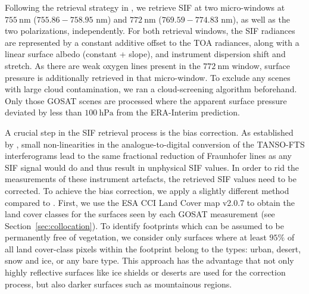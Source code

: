 \documentclass[review, a4paper, 10pt, times]{elsarticle}
\begin{document}
Following the retrieval strategy in \citet{Frankenberg2011}, we retrieve SIF at two micro-windows at $755\:\mathrm{nm}$ ($755.86 - 758.95$ nm) and $772\:\mathrm{nm}$ ($769.59 - 774.83$ nm), as well as the two polarizations, independently. For both retrieval windows, the SIF radiances are represented by a constant additive offset to the TOA radiances, along with a linear surface albedo (constant + slope), and instrument dispersion shift and stretch. As there are weak oxygen lines present in the $772\:\mathrm{nm}$ window, surface pressure is additionally retrieved in that micro-window. To exclude any scenes with large cloud contamination, we ran a cloud-screening algorithm beforehand. Only those GOSAT scenes are processed where the apparent surface pressure deviated by less than $100\:\mathrm{hPa}$ from the ERA-Interim prediction.

A crucial step in the SIF retrieval process is the bias correction. As established by \citet{Frankenberg2011}, small non-linearities in the analogue-to-digital conversion of the TANSO-FTS interferograms lead to the same fractional reduction of Fraunhofer lines as any SIF signal would do and thus result in unphysical SIF values. In order to rid the measurements of these instrument artefacts, the retrieved SIF values need to be corrected. To achieve the bias correction, we apply a slightly different method compared to \citet{Frankenberg2011}. First, we use the ESA CCI Land Cover map v2.0.7 \citep{Bontemps2013} to obtain the land cover classes for the surfaces seen by each GOSAT measurement (see Section~\ref{sec:collocation}). To identify footprints which can be assumed to be permanently free of vegetation, we consider only surfaces where at least $95\%$ of all land cover-class pixels within the footprint belong to the types: urban, desert, snow and ice, or any bare type. This approach has the advantage that not only highly reflective surfaces like ice shields or deserts are used for the correction process, but also darker surfaces such as mountainous regions.
\end{document}
